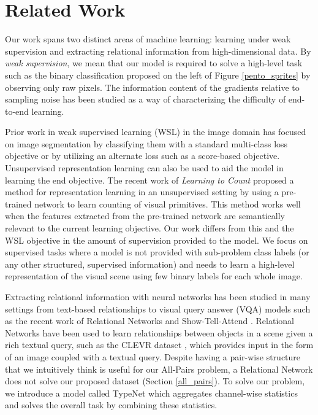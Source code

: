 \section{Related Work} \label{related}

Our work spans two distinct areas of machine learning: learning under
weak supervision and extracting
relational information from high-dimensional data. By \emph{weak supervision}, we mean that our
model is required to solve a high-level task such as the binary
classification proposed on the left of Figure \ref{pento_sprites}
by observing only raw pixels.  
\ifarxiv
The information content of the gradients relative to sampling noise has been
studied \cite{2017failures} as a way of characterizing the difficulty of end-to-end learning.
\fi

Prior work in weak supervised learning (WSL) in the image domain has
focused on image segmentation by classifying them with a standard
multi-class loss objective \cite{oquab2015object} or by utilizing an
alternate loss such as a score-based \cite{durand2016weldon} objective.
Unsupervised representation learning can also be used to aid the model
in learning the end objective. The recent work of {\em Learning to Count}
\cite{noroozi2017representation} proposed a method for representation
learning in an unsupervised setting by using a pre-trained network
to learn counting of visual primitives. This method works well
when the features extracted from the pre-trained network are
semantically relevant to the current learning objective. Our work
differs from this and the WSL objective in the amount of supervision
provided to the model. We focus on supervised tasks where a model is not
provided with sub-problem class labels (or any other structured,
supervised information) and needs to learn a high-level representation of
the visual scene using few binary labels for each whole image.

Extracting relational information with neural networks has been studied in many settings
from text-based relationships \cite{das2016chains, weston2014memory} to
visual query answer (VQA) models such as the recent work of Relational
Networks \cite{santoro2017simple} and Show-Tell-Attend
\cite{xu2015show}. Relational Networks have been used to learn
relationships between objects in a scene given a rich textual query,
such as the CLEVR dataset \cite{johnson2017clevr}, which provides input
in the form of an image coupled with a textual query.  Despite having a pair-wise structure that we
intuitively think is useful for our All-Pairs problem, a Relational
Network \cite{santoro2017simple} does not solve our proposed dataset
(Section \ref{all_pairs}). To solve our problem, we introduce a model
called TypeNet which aggregates channel-wise statistics and solves the
overall task by combining these statistics.

